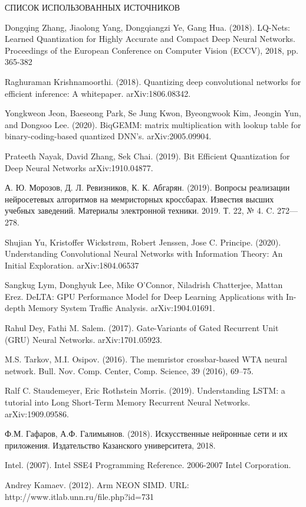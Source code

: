 \Biblio
\begin{center}
СПИСОК ИСПОЛЬЗОВАННЫХ ИСТОЧНИКОВ
\end{center}



\begin{thebibliography}{9}
     Dongqing Zhang, Jiaolong Yang, Dongqiangzi Ye, Gang Hua. (2018). LQ-Nets: Learned Quantization for Highly Accurate and Compact Deep Neural Networks. Proceedings of the European Conference on Computer
Vision (ECCV), 2018, pp. 365-382

    Raghuraman Krishnamoorthi. (2018). Quantizing deep convolutional networks for efficient inference: A whitepaper. arXiv:1806.08342.

     Yongkweon Jeon, Baeseong Park, Se Jung Kwon, Byeongwook Kim, Jeongin Yun, and Dongsoo Lee. (2020). BiqGEMM: matrix multiplication with lookup table for binary-coding-based quantized DNN's. arXiv:2005.09904.
    
     Prateeth Nayak, David Zhang, Sek Chai. (2019). Bit Efficient Quantization for Deep Neural Networks arXiv:1910.04877.
    
     А. Ю. Морозов, Д. Л. Ревизников, К. К. Абгарян. (2019). Вопросы реализации нейросетевых алгоритмов на мемристорных кроссбарах. Известия высших учебных заведений. Материалы электронной техники. 2019. Т. 22, № 4. C. 272—278.
    
     Shujian Yu, Kristoffer Wickstrøm, Robert Jenssen, Jose C. Principe. (2020). Understanding Convolutional Neural Networks with Information Theory: An Initial Exploration. arXiv:1804.06537
    
     Sangkug Lym, Donghyuk Lee, Mike O’Connor, Niladrish Chatterjee, Mattan Erez. DeLTA: GPU Performance Model for Deep Learning Applications with In-depth Memory System Traffic Analysis. arXiv:1904.01691.
    
     Rahul Dey, Fathi M. Salem. (2017). Gate-Variants of Gated Recurrent Unit (GRU) Neural Networks. arXiv:1701.05923.
    
     M.S. Tarkov, M.I. Osipov. (2016). The memristor crossbar-based WTA neural network. Bull. Nov. Comp. Center, Comp. Science, 39 (2016), 69–75.
    
     Ralf C. Staudemeyer, Eric Rothstein Morris. (2019). Understanding LSTM: a tutorial into Long Short-Term Memory Recurrent Neural Networks. arXiv:1909.09586.
    
     Ф.М. Гафаров, А.Ф. Галимьянов. (2018). Искусственные нейронные сети и их приложения. Издательство Казанского университета, 2018.
    
     Intel. (2007). Intel SSE4 Programming Reference. 2006-2007 Intel Corporation.
    
     Andrey Kamaev. (2012). Arm NEON SIMD. URL: http://www.itlab.unn.ru/file.php?id=731
    
\end{thebibliography}